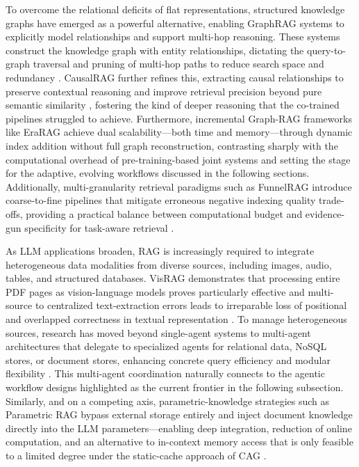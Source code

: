 \documentclass[11pt,a4paper]{article}
\begin{document}
To overcome the relational deficits of flat representations, structured knowledge graphs have emerged as a powerful alternative, enabling GraphRAG systems to explicitly model relationships and support multi-hop reasoning. These systems construct the knowledge graph with entity relationships, dictating the query-to-graph traversal and pruning of multi-hop paths to reduce search space and redundancy \cite{arxiv:2502.14902v2}. CausalRAG further refines this, extracting causal relationships to preserve contextual reasoning and improve retrieval precision beyond pure semantic similarity \cite{arxiv:2503.19878v3}, fostering the kind of deeper reasoning that the co-trained pipelines struggled to achieve. Furthermore, incremental Graph-RAG frameworks like EraRAG achieve dual scalability---both time and memory---through dynamic index addition without full graph reconstruction, contrasting sharply with the computational overhead of pre-training-based joint systems \cite{arxiv:2506.20963v2} and setting the stage for the adaptive, evolving workflows discussed in the following sections. Additionally, multi-granularity retrieval paradigms such as FunnelRAG introduce coarse-to-fine pipelines that mitigate erroneous negative indexing quality trade-offs, providing a practical balance between computational budget and evidence-gun specificity for task-aware retrieval \cite{arxiv:2410.10293v3}.

As LLM applications broaden, RAG is increasingly required to integrate heterogeneous data modalities from diverse sources, including images, audio, tables, and structured databases. VisRAG demonstrates that processing entire PDF pages as vision-language models proves particularly effective and multi-source to centralized text-extraction errors leads to irreparable loss of positional and overlapped correctness in textual representation \cite{arxiv:2410.10594v2}. To manage heterogeneous sources, research has moved beyond single-agent systems to multi-agent architectures that delegate to specialized agents for relational data, NoSQL stores, or document stores, enhancing concrete query efficiency and modular flexibility \cite{arxiv:2412.05838v1}. This multi-agent coordination naturally connects to the agentic workflow designs highlighted as the current frontier in the following subsection. Similarly, and on a competing axis, parametric-knowledge strategies such as Parametric RAG bypass external storage entirely and inject document knowledge directly into the LLM parameters---enabling deep integration, reduction of online computation, and an alternative to in-context memory access that is only feasible to a limited degree under the static-cache approach of CAG \cite{arxiv:2501.15915v1,arxiv:2510.12668v2}.
\end{document}

